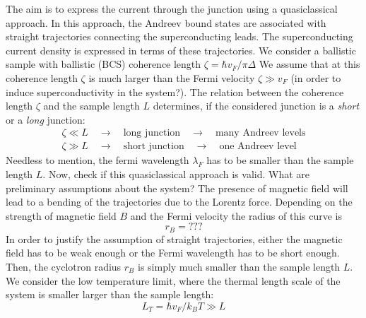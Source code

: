 The aim is to express the current through the junction using a quasiclassical approach. In this approach, the Andreev bound states are associated with straight trajectories connecting the superconducting leads. The superconducting current density is expressed in terms of these trajectories. We consider a ballistic sample with ballistic (BCS) coherence length $\zeta = \hbar v_F / \pi \Delta$ %
We assume that at this coherence length $\zeta$ is much larger than the Fermi velocity $\zeta \gg v_F$ (in order to induce superconductivity in the system?). The relation between the coherence length $\zeta$ and the sample length $L$ determines, if the considered junction is a \textit{short} or a \textit{long} junction:
\begin{eqnarray*}
\zeta \ll L \quad \rightarrow \quad \text{long junction} \quad \rightarrow \quad \text{many Andreev levels} \\ 
\zeta \gg L \quad \rightarrow \quad \text{short junction} \quad \rightarrow \quad \text{one Andreev level} 
\end{eqnarray*}
Needless to mention, the fermi wavelength $\lambda_F$ has to be smaller than the sample length $L$. 
Now, check if this quasiclassical approach is valid. What are preliminary assumptions about the system?
The presence of magnetic field will lead to a bending of the trajectories due to the Lorentz force. Depending on the strength of magnetic field $B$ and the Fermi velocity the radius of this curve is 
\begin{equation}
r_B = ???
\end{equation}
In order to justify the assumption of straight trajectories, either the magnetic field has to be weak enough or the Fermi wavelength has to be short enough. Then, the cyclotron radius $r_B$ is simply much smaller than the sample length $L$. 
We consider the low temperature limit, where the thermal length scale of the system is smaller larger than the sample length:
\begin{equation}
L_T = \hbar v_F / k_B T \gg L
\end{equation} 

